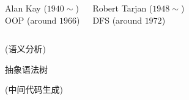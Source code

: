 \begin{frame}{}
  \begin{columns}
      \begin{center}
        Alan Kay ($1940 \sim$) \\[6pt]
        OOP (around $1966$)
      \end{center}
      \begin{center}
        Robert Tarjan ($1948 \sim$) \\[6pt]
        DFS (around $1972$)
      \end{center}
  \end{columns}
\end{frame}

\begin{frame}{}
  \begin{center}
    \begin{columns}[b]
        \vspace{-0.10cm}
        \begin{center}
        \end{center}
        \vspace{-0.60cm}
        \begin{center}
        \end{center}
        \begin{center}
        \end{center}
        \begin{center}
        \end{center}
    \end{columns}
  \end{center}
\end{frame}

\begin{frame}{}
  \begin{center}
    \vspace{0.30cm}

    \vspace{0.30cm}
     (语义分析)

    \vspace{0.30cm}
    抽象语法树

    \vspace{0.30cm}
     (中间代码生成)
  \end{center}
\end{frame}
